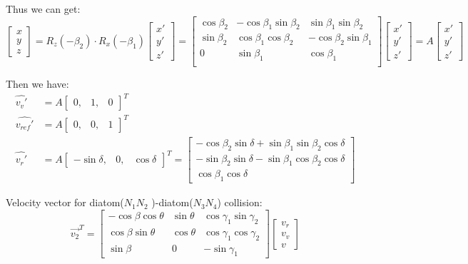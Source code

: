 \documentclass[11pt,letterpaper]{article}
\newcommand{\rvec}[3]{\begin{bmatrix} #1, &#2,&#3 \end{bmatrix}^T}
\begin{document}
Thus we can get:
\begin{equation}
\begin{bmatrix}
x\\y\\z
\end{bmatrix}  = R_z(-\beta_2) \cdot R_x(-\beta_1) \begin{bmatrix}
x' \\ y' \\z' 
\end{bmatrix} = \begin{bmatrix}
\cos \beta _2 & -\cos \beta _1 \sin \beta _2 & \sin
\beta _1 \sin \beta _2 \\
\sin \beta _2 & \cos \beta _1 \cos \beta _2 & -\cos
\beta _2 \sin \beta _1 \\
0 & \sin \beta _1 & \cos \beta _1 \\
\end{bmatrix}\begin{bmatrix}
x' \\ y' \\z' 
\end{bmatrix}  = A \begin{bmatrix}
x' \\ y' \\z' 
\end{bmatrix}  
\end{equation}

Then we have:
\begin{equation}
\begin{aligned}
\hat{v_v'} &= A \rvec{0}{1}{0} \\
\hat{v_{ref}'} & = A \rvec{0}{0}{1}  \\
\hat{v_r'} & = A \rvec{-\sin \delta}{0}{\cos \delta}= \begin{bmatrix}
-\cos \beta_2 \sin \delta +\sin \beta_1 \sin \beta_2 \cos \delta  \\
-\sin \beta_2 \sin \delta -\sin \beta_1 \cos \beta_2 \cos \delta  \\
\cos \beta_1 \cos \delta 
\end{bmatrix}
\end{aligned}
\end{equation}


Velocity vector for diatom($ N_1N_2$ )-diatom($ N_3N_4 $) collision:
\begin{equation}
\vec{v_2}^T =     \begin{bmatrix}
-\cos \beta \cos \theta & \sin \theta & \cos \gamma_1 \sin \gamma_2  \\ 
\cos \beta \sin \theta & \cos \theta & \cos \gamma_1 \cos \gamma_2  \\ 
\sin \beta & 0 & -\sin \gamma_1  
\end{bmatrix}  \begin{bmatrix}
   v_{r} \\
   v_v\\
   v
\end{bmatrix}
\end{equation}
\end{document}
